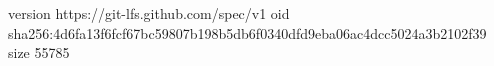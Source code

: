 version https://git-lfs.github.com/spec/v1
oid sha256:4d6fa13f6fcf67bc59807b198b5db6f0340dfd9eba06ac4dcc5024a3b2102f39
size 55785
